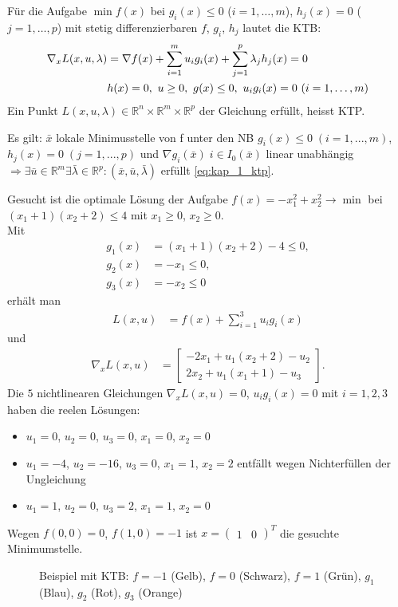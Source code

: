 Für die Aufgabe $\min f(x)$ bei $g_i(x)\le 0$ ($i=1,\ldots,m$), $h_j(x)=0$ ($j=1,\ldots,p$) mit stetig differenzierbaren $f$, $g_i$, $h_j$ lautet die \ac{KTB}:
\begin{align}
	\nabla_x L(x,u,\lambda) & = \nabla f(x)+\sum\limits_{i=1}^m u_ig_i(x)+\sum\limits_{j=1}^p\lambda_j h_j(x) = 0 \label{eq:kap_1_ktp}\\
	& h(x) = 0,\ u\ge 0,\ g(x)\le 0,\ u_ig_i(x)=0\ (i=1,\ldots,m) \notag
\end{align}
Ein Punkt $L(x,u,\lambda) \in \mathbb{R}^n \times \mathbb{R}^m \times \mathbb{R}^p$ der Gleichung  erfüllt, heisst \ac{KTP}.

Es gilt: $\bar{x}$ lokale Minimusstelle von f unter den \ac{NB} $g_i(x) \le 0 \;(i=1,...,m)$, $h_j(x) = 0 \;(j=1,...,p)$ und $\nabla g_i(\bar{x})\; i \in I_0 (\bar{x})$ linear unabhängig $\Rightarrow \exists \bar{u} \in \mathbb{R}^m \exists \bar{\lambda} \in \mathbb{R}^p: (\bar{x}, \bar{u}, \bar{\lambda})$ erfüllt \ref{eq:kap_1_ktp}.
\begin{exmp}
Gesucht ist die optimale Lösung der Aufgabe $f(x)=-x^2_1+x_2^2\rightarrow\min$ bei $(x_1+1)(x_2+2)\le 4$ mit $x_1\ge 0$, $x_2\ge 0$.\\
Mit 
\begin{align*}
	g_1(x) & = (x_1+1)(x_2+2)-4\le 0,\\
	g_2(x) & = -x_1\le 0,\\
	g_3(x) & = -x_2\le 0 
\end{align*}
erhält man
\begin{align*}
	L(x,u) & = f(x)+\sum\limits_{i=1}^3u_ig_i(x)
\end{align*}
und
\begin{align*}
\nabla_x L(x,u) & = \begin{bmatrix}
-2x_1+u_1(x_2+2)-u_2\\
2x_2+u_1(x_1+1)-u_3
\end{bmatrix}.
\end{align*}
Die $5$ nichtlinearen Gleichungen $\nabla_x L(x,u)=0$, $u_ig_i(x)=0$ mit $i=1,2,3$ haben die reelen Lösungen:
\begin{itemize}
	\item $u_1=0$, $u_2=0$, $u_3=0$, $x_1=0$, $x_2=0$
	\item $u_1=-4$, $u_2=-16$, $u_3=0$, $x_1=1$, $x_2=2$ entfällt wegen Nichterfüllen der Ungleichung 
	\item $u_1=1$, $u_2=0$, $u_3=2$, $x_1=1$, $x_2=0$
\end{itemize}
Wegen $f(0,0)=0$, $f(1,0)=-1$ ist $x=\begin{pmatrix} 1 & 0 \end{pmatrix}^T$ die gesuchte Minimumstelle.
\begin{figure}[!htb]
	\centering
	
	\caption{Beispiel mit \ac{KTB}: $f=-1$ (Gelb), $f=0$ (Schwarz), $f=1$ (Grün), $g_1$ (Blau), $g_2$ (Rot), $g_3$ (Orange)}
	\label{fig:kap_1_ktp}
\end{figure}
\end{exmp}

